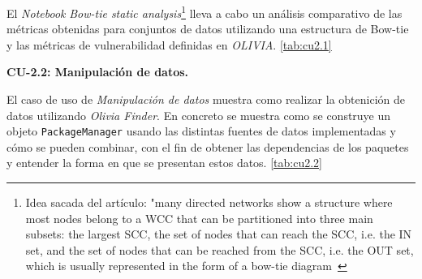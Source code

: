 El \textit{Notebook} \textit{Bow-tie static analysis}\footnote{Idea sacada del artículo:
	"many directed networks show a structure where most nodes belong to a WCC that can be
	partitioned into three main subsets: the largest SCC, the set of nodes that can reach the
	SCC, i.e. the IN set, and the set of nodes that can be reached from the SCC, i.e. the OUT
	set, which is usually represented in the form of a bow-tie diagram~\cite{Broder2000309}} lleva a cabo un análisis comparativo de las
métricas obtenidas para conjuntos de datos utilizando una estructura de Bow-tie\cite{enwiki:1148363387} y
las métricas de vulnerabilidad definidas en \textit{OLIVIA}. \ref{tab:cu2.1}



\textbf{CU-2.2: Manipulación de datos.}

El caso de uso de \textit{Manipulación de datos} muestra como realizar la obtenición de datos utilizando \textit{Olivia Finder}.
En concreto se muestra como se construye un objeto \texttt{PackageManager} usando las distintas fuentes de datos implementadas y cómo se pueden combinar, con el fin de obtener las dependencias
de los paquetes y entender la forma en que se presentan estos datos. \ref{tab:cu2.2}

